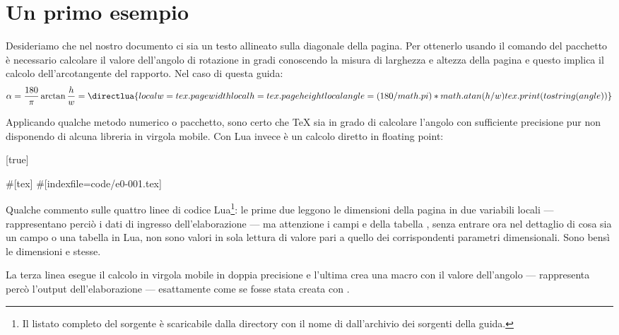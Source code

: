 \section{Un primo esempio}

Desideriamo che nel nostro documento ci sia un testo allineato sulla diagonale
della pagina. Per ottenerlo usando il comando  del pacchetto
 è necessario calcolare il valore dell'angolo di rotazione in
gradi conoscendo la misura di larghezza e altezza della pagina e questo implica
il calcolo dell'arcotangente del rapporto. Nel caso di questa guida:
\[
    \alpha = \frac{180}{\pi}\arctan{\frac{h}{w}} = \directlua{
        local w = tex.pagewidth
        local h = tex.pageheight
        local angle = (180/math.pi) * math.atan(h/w)
        tex.print(tostring(angle))
    }
\]

Applicando qualche metodo numerico o pacchetto, sono certo che \TeX{} sia in
grado di calcolare l'angolo con sufficiente precisione pur non disponendo di
alcuna libreria in virgola mobile. Con Lua invece è un calcolo diretto in
floating point:

[true]%
%
%
\begin{lines}
#[tex]
#[indexfile=code/e0-001.tex]
\end{lines}

Qualche commento sulle quattro linee di codice Lua\footnote{Il listato completo
del sorgente è scaricabile dalla directory  con il nome di
 dall'archivio dei sorgenti della guida.}: le prime due
leggono le dimensioni della pagina in due variabili locali --- rappresentano
perciò i dati di ingresso dell'elaborazione --- ma attenzione i campi
 e  della tabella , senza entrare ora
nel dettaglio di cosa sia un campo o una tabella in Lua, non sono valori in sola
lettura di valore pari a quello dei corrispondenti parametri dimensionali. Sono
bensì le dimensioni  e  stesse.

La terza linea esegue il calcolo in virgola mobile in doppia precisione e
l'ultima crea una macro  con il valore dell'angolo --- rappresenta
percò l'output dell'elaborazione --- esattamente come se fosse stata creata con
.

